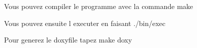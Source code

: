 Vous pouvez compiler le programme avec la commande make

Vous pouvez ensuite l executer en faisant ./bin/exec

Pour generez le doxyfile tapez make doxy 